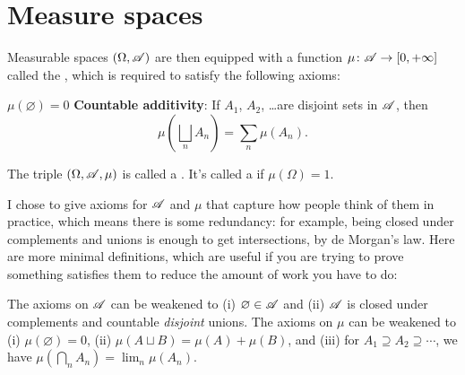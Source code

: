 \section{Measure spaces}
\begin{definition}
	Measurable spaces $(\Omega, \mathscr A)$ are then equipped
	with a function $\mu \colon \mathscr A \to [0, +\infty]$
	called the , which is required to satisfy
	the following axioms:
	\begin{itemize}
		\ii $\mu(\varnothing) = 0$
		\ii \textbf{Countable additivity}:
		If $A_1$, $A_2$, \dots are disjoint sets in $\mathscr A$,
		then \[ \mu\left( \bigsqcup_n A_n \right) = \sum_n \mu(A_n). \]
	\end{itemize}
	The triple $(\Omega, \mathscr A, \mu)$ is called a .
	It's called a  if $\mu(\Omega) = 1$.
\end{definition}
\begin{exercise}
	I chose to give axioms for $\mathscr A$ and $\mu$
	that capture how people think of them in practice,
	which means there is some redundancy:
	for example, being closed under complements and unions
	is enough to get intersections, by de Morgan's law.
	Here are more minimal definitions,
	which are useful if you are trying to prove something satisfies them
	to reduce the amount of work you have to do:
	\begin{enumerate}[(a)]
		\ii The axioms on $\mathscr A$ can be weakened
		to (i) $\varnothing \in \mathscr A$ and (ii) $\mathscr A$ is closed under
		complements and countable \emph{disjoint} unions.
		\ii The axioms on $\mu$ can be weakened to
		(i) $\mu(\varnothing) = 0$,
		(ii) $\mu(A \sqcup B) = \mu(A) + \mu(B)$, and
		(iii) for $A_1 \supseteq A_2 \supseteq \cdots$,
		we have $\mu\left( \bigcap_n A_n \right) = \lim_n \mu(A_n)$.
	\end{enumerate}
\end{exercise}


